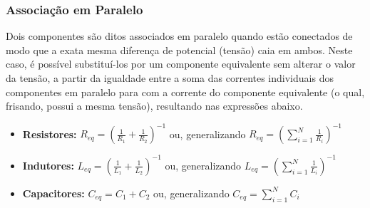 \documentclass{article}
\numberwithin{equation}{section}
\begin{document}
\subsubsection{Associação em Paralelo}
\label{subsubsec:paralelo}
Dois componentes são ditos associados em paralelo quando estão conectados de modo que a exata mesma diferença de potencial (tensão) caia em ambos. Neste caso, é possível substituí-los por um componente equivalente sem alterar o valor da tensão, a partir da igualdade entre a soma das correntes individuais dos componentes em paralelo para com a corrente do componente equivalente (o qual, frisando, possui a mesma tensão), resultando nas expressões abaixo.

\begin{itemize}
    \item \textbf{Resistores:} $R_{eq}= \left(\displaystyle{\frac{1}{R_{1}}} + \displaystyle{\frac{1}{R_{2}}}\right)^{-1}$ \hspace{2.3cm}
    ou, generalizando $R_{eq}= \left(\displaystyle{\sum_{i=1}^{N} \frac{1}{R_{i}}}\right)^{-1}$
    \item \textbf{Indutores:} $L_{eq}= \left(\displaystyle{\frac{1}{L_{1}}} + \displaystyle{\frac{1}{L_{2}}}\right)^{-1}$ \hspace{2.5cm}
    ou, generalizando $L_{eq}= \left(\displaystyle{\sum_{i=1}^{N} \frac{1}{L_{i}}}\right)^{-1}$
    \item \textbf{Capacitores:} $C_{eq}= C_{1} + C_{2} $ \hspace{3.15cm}
    ou, generalizando $C_{eq}= \displaystyle{\sum_{i=1}^{N} C_{i}}$
\end{itemize}
\end{document}
